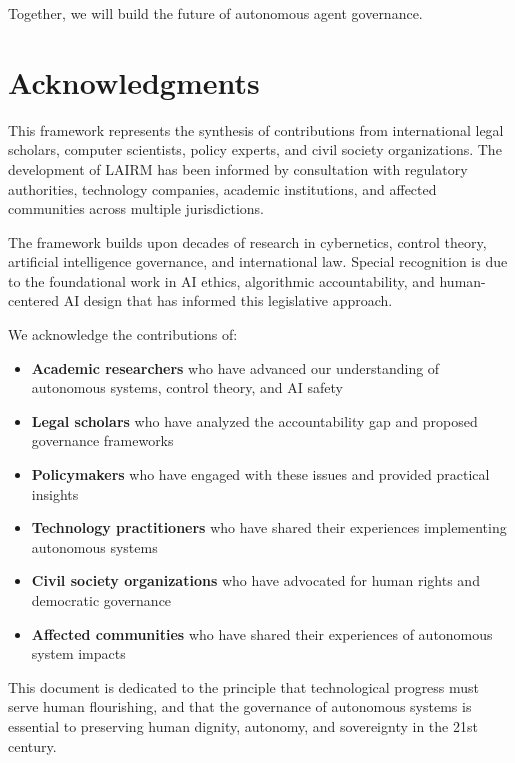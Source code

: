 \documentclass[12pt,a4paper,twoside,openright]{book}
\begin{document}
Together, we will build the future of autonomous agent governance.

\cleardoublepage

\chapter*{Acknowledgments}

This framework represents the synthesis of contributions from international legal scholars, computer scientists, policy experts, and civil society organizations. The development of LAIRM has been informed by consultation with regulatory authorities, technology companies, academic institutions, and affected communities across multiple jurisdictions.

The framework builds upon decades of research in cybernetics, control theory, artificial intelligence governance, and international law. Special recognition is due to the foundational work in AI ethics, algorithmic accountability, and human-centered AI design that has informed this legislative approach.

We acknowledge the contributions of:

\begin{itemize}
    \item \textbf{Academic researchers} who have advanced our understanding of autonomous systems, control theory, and AI safety
    \item \textbf{Legal scholars} who have analyzed the accountability gap and proposed governance frameworks
    \item \textbf{Policymakers} who have engaged with these issues and provided practical insights
    \item \textbf{Technology practitioners} who have shared their experiences implementing autonomous systems
    \item \textbf{Civil society organizations} who have advocated for human rights and democratic governance
    \item \textbf{Affected communities} who have shared their experiences of autonomous system impacts
\end{itemize}

This document is dedicated to the principle that technological progress must serve human flourishing, and that the governance of autonomous systems is essential to preserving human dignity, autonomy, and sovereignty in the 21st century.
\end{document}
